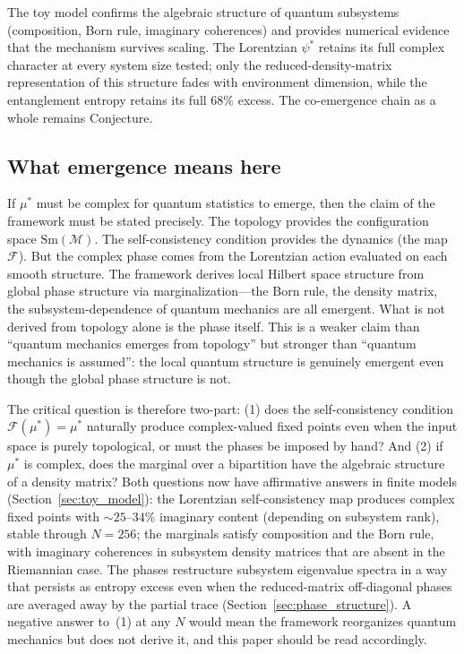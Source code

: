 \documentclass[12pt,a4paper]{article}
\theoremstyle{definition}
\theoremstyle{remark}
\begin{document}
The toy model confirms the algebraic structure of quantum subsystems
(composition, Born rule, imaginary coherences) and provides numerical evidence
that the mechanism survives scaling. The Lorentzian $\psi^*$ retains
its full complex character at every system size tested; only the
reduced-density-matrix representation of this structure fades with
environment dimension, while the entanglement entropy retains its full
$68\%$ excess. The co-emergence chain as a whole remains Conjecture.

\subsection{What emergence means here}
\label{sec:emergence_meaning}

If $\mu^*$ must be complex for quantum statistics to emerge, then the
claim of the framework must be stated precisely. The topology provides
the configuration space $\mathrm{Sm}(\mathcal{M})$. The self-consistency
condition provides the dynamics (the map $\mathcal{F}$). But the complex
phase comes from the Lorentzian action evaluated on each smooth
structure. The framework derives local Hilbert space structure from
global phase structure via marginalization---the Born rule, the density
matrix, the subsystem-dependence of quantum mechanics are all emergent.
What is not derived from topology alone is the phase itself. This is a
weaker claim than ``quantum mechanics emerges from topology'' but
stronger than ``quantum mechanics is assumed'': the local quantum
structure is genuinely emergent even though the global phase structure is
not.

The critical question is therefore two-part: (1) does the
self-consistency condition $\mathcal{F}(\mu^*) = \mu^*$ naturally
produce complex-valued fixed points even when the input space is purely
topological, or must the phases be imposed by hand? And (2) if $\mu^*$
is complex, does the marginal over a bipartition have the algebraic
structure of a density matrix? Both questions now have affirmative
answers in finite models (Section~\ref{sec:toy_model}): the Lorentzian
self-consistency map produces complex fixed points with $\sim 25$--$34\%$
imaginary content (depending on subsystem rank), stable through $N = 256$; the marginals satisfy
composition and the Born rule, with imaginary coherences in subsystem
density matrices that are absent in the Riemannian case. The phases
restructure subsystem eigenvalue spectra in a way that persists as
entropy excess even when the reduced-matrix off-diagonal phases are
averaged away by the partial trace
(Section~\ref{sec:phase_structure}). A negative answer to~(1) at any $N$
would mean the framework reorganizes quantum mechanics but does not
derive it, and this paper should be read accordingly.
\end{document}

